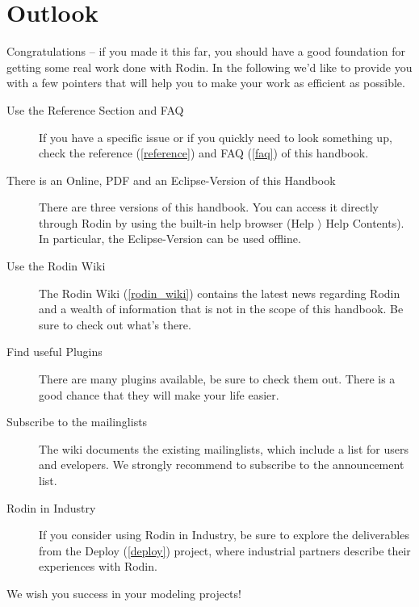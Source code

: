 \section{Outlook}
\label{tutorial_11}

Congratulations -- if you made it this far, you should have a good foundation for getting some real work done with Rodin.  In the following we'd like to provide you with a few pointers that will help you to make your work as efficient as possible.

\begin{description}
	\item[Use the Reference Section and FAQ] If you have a specific issue or if you quickly need to look something up, check the reference (\ref{reference}) and FAQ (\ref{faq}) of this handbook.
	\item[There is an Online, PDF and an Eclipse-Version of this Handbook] There are three versions of this handbook.  You can access it directly through Rodin by using the built-in help browser (\textsf{Help $\rangle$ Help Contents}).  In particular, the Eclipse-Version can be used offline.
	\item[Use the Rodin Wiki] The Rodin Wiki (\ref{rodin_wiki}) contains the latest news regarding Rodin and a wealth of information that is not in the scope of this handbook.  Be sure to check out what's there.
	\item[Find useful Plugins] There are many plugins available, be sure to check them out.  There is a good chance that they will make your life easier.
	\item[Subscribe to the mailinglists] The wiki documents the existing mailinglists, which include a list for users and evelopers.  We strongly recommend to subscribe to the announcement list.
	\item[Rodin in Industry] If you consider using Rodin in Industry, be sure to explore the deliverables from the Deploy (\ref{deploy}) project, where industrial partners describe their experiences with Rodin.
\end{description}

We wish you success in your modeling projects!

